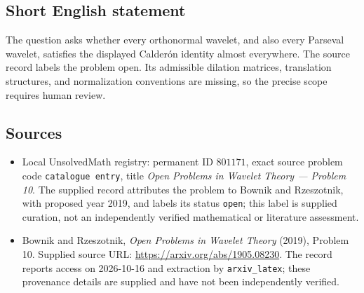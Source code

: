 \documentclass[11pt]{article}
\begin{document}
\subsection{Short English statement}
The question asks whether every orthonormal wavelet, and also every Parseval wavelet, satisfies the displayed Calder\'on identity almost everywhere. The source record labels the problem open. Its admissible dilation matrices, translation structures, and normalization conventions are missing, so the precise scope requires human review.
\subsection{Sources}
\begin{itemize}
\item Local UnsolvedMath registry: permanent ID \(801171\), exact source problem code \texttt{catalogue entry}, title \emph{Open Problems in Wavelet Theory --- Problem 10}. The supplied record attributes the problem to Bownik and Rzeszotnik, with proposed year 2019, and labels its status \texttt{open}; this label is supplied curation, not an independently verified mathematical or literature assessment.
\item Bownik and Rzeszotnik, \emph{Open Problems in Wavelet Theory} (2019), Problem 10. Supplied source URL: \url{https://arxiv.org/abs/1905.08230}. The record reports access on 2026-10-16 and extraction by \texttt{arxiv\_latex}; these provenance details are supplied and have not been independently verified.
\end{itemize}
\end{document}

